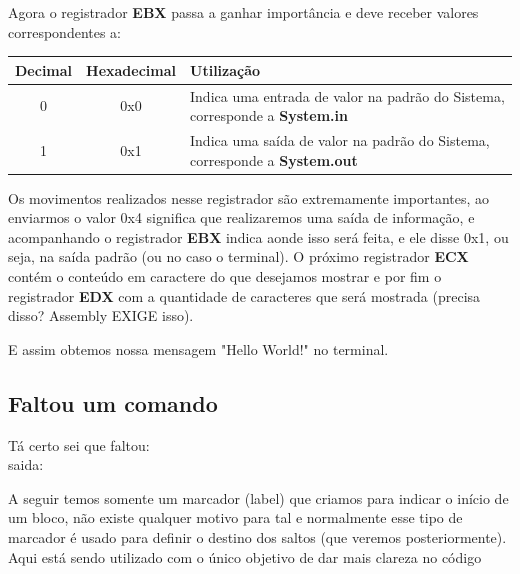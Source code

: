 Agora o registrador \textbf{EBX} passa a ganhar importância e deve receber valores correspondentes a:
\begin{table}[H]
	\centering 
	\begin{tabular}{c | c | l }
		\textbf{Decimal} & \textbf{Hexadecimal} & \textbf{Utilização} \\ \hline
		0 & 0x0 & Indica uma entrada de valor na padrão do Sistema, corresponde a \textbf{System.in} \\
		1 & 0x1 & Indica uma saída de valor na padrão do Sistema, corresponde a \textbf{System.out} \\
	\end{tabular}
\end{table}

Os movimentos realizados nesse registrador são extremamente importantes, ao enviarmos o valor 0x4 significa que realizaremos uma saída de informação, e acompanhando o registrador \textbf{EBX} indica aonde isso será feita, e ele disse 0x1, ou seja, na saída padrão (ou no caso o terminal). O próximo registrador \textbf{ECX} contém o conteúdo em caractere do que desejamos mostrar e por fim o registrador \textbf{EDX} com a quantidade de caracteres que será mostrada (precisa disso? Assembly EXIGE isso).

E assim obtemos nossa mensagem "Hello World!" no terminal.

\subsection{Faltou um comando}

Tá certo sei que faltou: \\
{\ttfamily saida:}

A seguir temos somente um marcador (label) que criamos para indicar o início de um bloco, não existe qualquer motivo para tal e normalmente esse tipo de marcador é usado para definir o destino dos saltos (que veremos posteriormente). Aqui está sendo utilizado com o único objetivo de dar mais clareza no código

